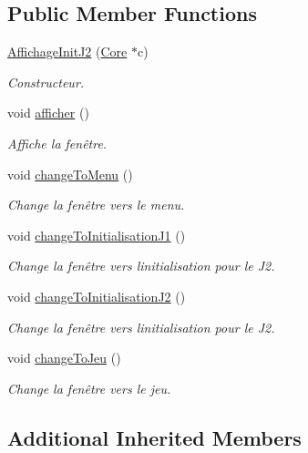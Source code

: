 \subsection*{Public Member Functions}
\begin{DoxyCompactItemize}
\item 
\hyperlink{class_affichage_init_j2_a8f9a34591f3e24cc990cccb66334bb35}{Affichage\+Init\+J2} (\hyperlink{class_core}{Core} $\ast$c)
\begin{DoxyCompactList}\small\item\em Constructeur. \end{DoxyCompactList}\item 
void \hyperlink{class_affichage_init_j2_a4b5dbe3833780c14aaaf946a7542e085}{afficher} ()
\begin{DoxyCompactList}\small\item\em Affiche la fenêtre. \end{DoxyCompactList}\item 
void \hyperlink{class_affichage_init_j2_a7266e6ce2188930080dc3ede1322d14d}{change\+To\+Menu} ()
\begin{DoxyCompactList}\small\item\em Change la fenêtre vers le menu. \end{DoxyCompactList}\item 
void \hyperlink{class_affichage_init_j2_a355056fd45cd18a199801eaf20181edc}{change\+To\+Initialisation\+J1} ()
\begin{DoxyCompactList}\small\item\em Change la fenêtre vers l\textquotesingle{}initialisation pour le J2. \end{DoxyCompactList}\item 
void \hyperlink{class_affichage_init_j2_a7f861d5e94c8ff21aae5b05601678292}{change\+To\+Initialisation\+J2} ()
\begin{DoxyCompactList}\small\item\em Change la fenêtre vers l\textquotesingle{}initialisation pour le J2. \end{DoxyCompactList}\item 
void \hyperlink{class_affichage_init_j2_ab2af503532ad81094f890d887bdb4f23}{change\+To\+Jeu} ()
\begin{DoxyCompactList}\small\item\em Change la fenêtre vers le jeu. \end{DoxyCompactList}\end{DoxyCompactItemize}
\subsection*{Additional Inherited Members}


